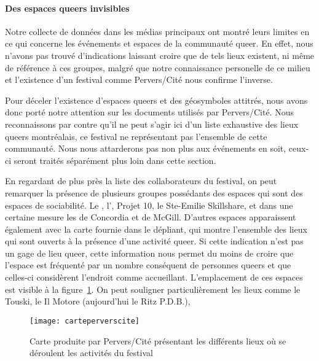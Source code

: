 \paragraph{Des espaces queers  invisibles}
Notre collecte de données dans les médias principaux ont montré leurs limites en ce qui concerne les événements et espaces de la communauté queer.
En effet, nous n'avons pas trouvé d'indications laissant croire que de tels lieux existent, ni même de référence à ces groupes, malgré que notre connaissance personelle de ce milieu et l'existence d'un festival comme Pervers/Cité nous confirme l'inverse.

Pour déceler l'existence d'espaces queers et des géosymboles attitrés, nous avons donc porté notre attention sur les documents utilisés par Pervers/Cité.
Nous reconnaissons par contre qu'il ne peut s'agir ici d'un liste exhaustive des lieux queers montréalais, ce festival ne représentant pas l'ensemble de cette communauté.
Nous nous attarderons pas non plus aux événements en soit, ceux-ci seront traités séparément plus loin dans cette section.

En regardant de plus près la liste des collaborateurs du festival, on peut remarquer la présence de plusieurs groupes possédants des espaces qui sont  des espaces de sociabilité.
Le \alccva, l'\astteq, Projet 10, le Ste-Emilie Skillshare, et dans une certaine mesure les \grip de Concordia et de McGill.
D'autres espaces apparaissent également avec la carte fournie dans le dépliant, qui montre l'ensemble des lieux qui sont ouverts à la présence d'une activité queer.
Si cette indication n'est pas un gage de lieu queer, cette information nous permet du moins de croire que l'espace est fréquenté par un nombre conséquent de personnes queers et que celles-ci considèrent l'endroit comme accueillant.
L'emplacement de ces espaces est visible à la figure~\ref{fig:carteperverscite}.
On peut souligner particulièrement les lieux comme le Touski, le Il Motore (aujourd'hui le Ritz P.D.B.),

\begin{figure}[ht]
	\centering
	\texttt{[image: carteperverscite]}
  \caption[Carte des activités de Pervers/Cité]{Carte produite par Pervers/Cité présentant les différents lieux où se déroulent les activités du festival}\label{fig:carteperverscite}
  \source{\agq{}}
\end{figure}

